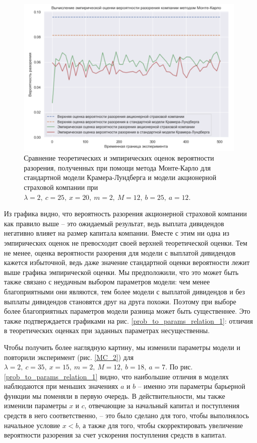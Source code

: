 \documentclass{article}
\theoremstyle{plain}
\theoremstyle{plain}
\theoremstyle{plain}
\theoremstyle{plain}
\theoremstyle{definition}
\theoremstyle{remark}
\begin{document}
\begin{figure}[h]
\centering
\includegraphics[scale=0.7]{images/KL_stock_MC_1.png}
\captionsetup{justification=centering}
\caption{Сравнение теоретических и эмпирических оценок вероятности разорения, полученных при помощи метода Монте-Карло для стандартной модели Крамера-Лундберга и модели акционерной страховой компании при $\lambda = 2,\ c = 25,\ x = 20,\ m = 2,\ M = 12,\ b = 25,\ a = 12$.}
\label{MC_1}
\end{figure}

Из графика видно, что вероятность разорения акционерной страховой компании как правило выше -- это ожидаемый результат, ведь выплата дивидендов негативно влияет на размер капитала компании. Вместе с этим ни одна из эмпирических оценок не превосходит своей верхней теоретической оценки. Тем не менее, оценка вероятности разорения для модели с выплатой дивидендов кажется избыточной, ведь даже значение стандартной оценки вероятности лежит выше графика эмпирической оценки. Мы предположили, что это может быть также связано с неудачным выбором параметров модели: чем менее благоприятными они являются, тем более модели с выплатой дивидендов и без выплаты дивидендов становятся друг на друга похожи. Поэтому при выборе более благоприятных параметров модели разница может быть существеннее. Это также подтверждается графиками на рис. \ref{prob_to_params_relation_1}: отличия в теоретических оценках при заданных параметрах несущественны.

Чтобы получить более наглядную картину, мы изменили параметры модели и повторили эксперимент (рис. \ref{MC_2}) для $\lambda = 2,\ c = 35,\ x = 15,\ m = 2,\ M = 12,\ b = 18,\ a = 7$. По рис. \ref{prob_to_params_relation_1} видно, что наибольшие отличия в моделях наблюдаются при меньших значениях $a$ и $b$ -- именно эти параметры барьерной функции мы поменяли в первую очередь. В действительности, мы также изменили параметры $x$ и $c$, отвечающие за начальный капитал и поступления средств в него соответственно, -- это было сделано для того, чтобы выполнялось начальное условие $x < b$, а также для того, чтобы скорректировать увеличение вероятности разорения за счет ускорения поступления средств в капитал.
\end{document}
